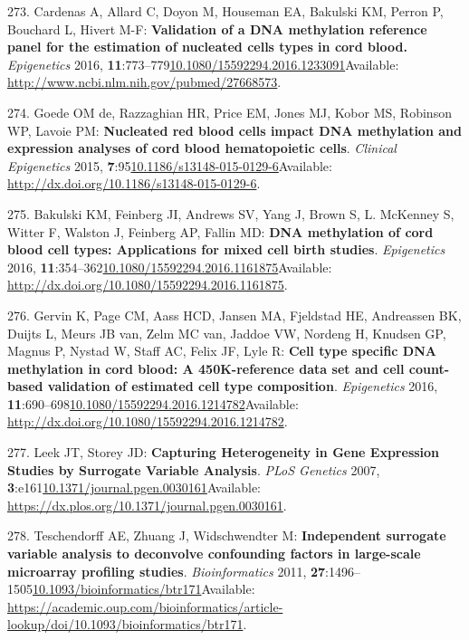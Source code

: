 \documentclass[
]{book}
\begin{document}
\leavevmode\hypertarget{ref-Cardenas2016}{}%
273. Cardenas A, Allard C, Doyon M, Houseman EA, Bakulski KM, Perron P, Bouchard L, Hivert M-F: \textbf{Validation of a DNA methylation reference panel for the estimation of nucleated cells types in cord blood.} \emph{Epigenetics} 2016, \textbf{11}:773--779\href{https://doi.org/10.1080/15592294.2016.1233091}{10.1080/15592294.2016.1233091}Available: \url{http://www.ncbi.nlm.nih.gov/pubmed/27668573}.

\leavevmode\hypertarget{ref-DeGoede2015}{}%
274. Goede OM de, Razzaghian HR, Price EM, Jones MJ, Kobor MS, Robinson WP, Lavoie PM: \textbf{Nucleated red blood cells impact DNA methylation and expression analyses of cord blood hematopoietic cells}. \emph{Clinical Epigenetics} 2015, \textbf{7}:95\href{https://doi.org/10.1186/s13148-015-0129-6}{10.1186/s13148-015-0129-6}Available: \url{http://dx.doi.org/10.1186/s13148-015-0129-6}.

\leavevmode\hypertarget{ref-Bakulski2016}{}%
275. Bakulski KM, Feinberg JI, Andrews SV, Yang J, Brown S, L. McKenney S, Witter F, Walston J, Feinberg AP, Fallin MD: \textbf{DNA methylation of cord blood cell types: Applications for mixed cell birth studies}. \emph{Epigenetics} 2016, \textbf{11}:354--362\href{https://doi.org/10.1080/15592294.2016.1161875}{10.1080/15592294.2016.1161875}Available: \url{http://dx.doi.org/10.1080/15592294.2016.1161875}.

\leavevmode\hypertarget{ref-Gervin2016}{}%
276. Gervin K, Page CM, Aass HCD, Jansen MA, Fjeldstad HE, Andreassen BK, Duijts L, Meurs JB van, Zelm MC van, Jaddoe VW, Nordeng H, Knudsen GP, Magnus P, Nystad W, Staff AC, Felix JF, Lyle R: \textbf{Cell type specific DNA methylation in cord blood: A 450K-reference data set and cell count-based validation of estimated cell type composition}. \emph{Epigenetics} 2016, \textbf{11}:690--698\href{https://doi.org/10.1080/15592294.2016.1214782}{10.1080/15592294.2016.1214782}Available: \url{http://dx.doi.org/10.1080/15592294.2016.1214782}.

\leavevmode\hypertarget{ref-Leek2007}{}%
277. Leek JT, Storey JD: \textbf{Capturing Heterogeneity in Gene Expression Studies by Surrogate Variable Analysis}. \emph{PLoS Genetics} 2007, \textbf{3}:e161\href{https://doi.org/10.1371/journal.pgen.0030161}{10.1371/journal.pgen.0030161}Available: \url{https://dx.plos.org/10.1371/journal.pgen.0030161}.

\leavevmode\hypertarget{ref-Teschendorff2011}{}%
278. Teschendorff AE, Zhuang J, Widschwendter M: \textbf{Independent surrogate variable analysis to deconvolve confounding factors in large-scale microarray profiling studies}. \emph{Bioinformatics} 2011, \textbf{27}:1496--1505\href{https://doi.org/10.1093/bioinformatics/btr171}{10.1093/bioinformatics/btr171}Available: \url{https://academic.oup.com/bioinformatics/article-lookup/doi/10.1093/bioinformatics/btr171}.
\end{document}

